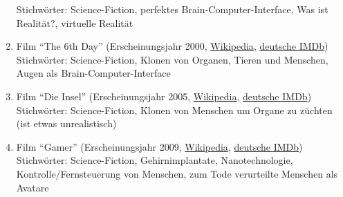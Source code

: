 \begin{enumerate}
		Stichwörter: Science-Fiction, perfektes Brain-Computer-Interface,
		Was ist Realität?, virtuelle Realität
	\item Film \enquote{The 6th Day}
		(Erscheinungsjahr 2000, \href{http://de.wikipedia.org/wiki/The_6th_Day}{Wikipedia},
		\href{http://www.imdb.de/title/tt0216216/}{deutsche IMDb}) \\
		Stichwörter: Science-Fiction, Klonen von Organen, Tieren und Menschen,
			Augen als Brain-Computer-Interface
	\item Film \enquote{Die Insel}
		(Erscheinungsjahr 2005, \href{http://de.wikipedia.org/wiki/Die_Insel_(2005)}{Wikipedia},
		\href{http://www.imdb.de/title/tt0399201/}{deutsche IMDb}) \\
		Stichwörter: Science-Fiction, Klonen von Menschen um Organe zu züchten
			(ist etwas unrealistisch)
	\item Film \enquote{Gamer}
		(Erscheinungsjahr 2009, \href{http://de.wikipedia.org/wiki/Gamer}{Wikipedia},
		\href{http://www.imdb.de/title/tt1034032/}{deutsche IMDb}) \\
		Stichwörter: Science-Fiction, Gehirnimplantate, Nanotechnologie,
			Kontrolle/Fernsteuerung von Menschen,
			zum Tode verurteilte Menschen als Avatare
\end{enumerate}

